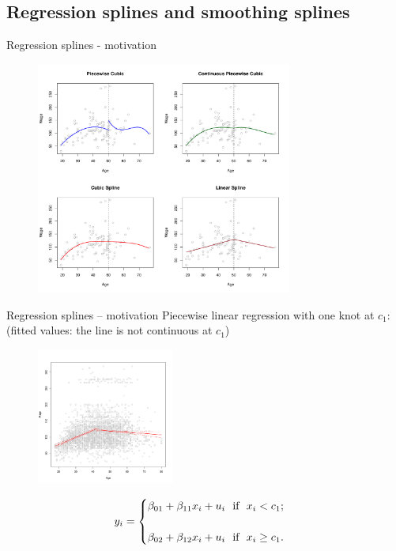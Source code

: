 \documentclass{beamer}
\begin{document}
\subsection{Regression splines and smoothing splines}
\begin{frame}{Regression splines - motivation}
\centering
\vspace{-0.2cm}
\begin{figure}
  \centering
  \includegraphics[trim=0cm 0cm 0cm 0cm, clip=true, width=0.75\textwidth]{IMG/ISLR73.pdf}
\end{figure}
\end{frame}
\begin{frame}{Regression splines -- motivation}
\centering
Piecewise linear regression with one knot at $c_1$:\\
(fitted values: the line is not continuous at $c_1$)\\
\vspace{-0.2cm}
\begin{figure}
  \centering
  \includegraphics[trim=0cm 0cm 0cm 0cm, clip=true, width=0.4\textwidth]{IMG/ISLR73a.pdf}
\end{figure}
\vspace{-0.2cm}
\begin{equation*}
y_i = 
    \begin{cases}
        \beta_{01} + \beta_{11} x_i + u_i \textnormal{~~if~~} x_i <  c_1 ;& \\ ~ & \\
         \beta_{02} + \beta_{12} x_i + u_i \textnormal{~~if~~} x_i \geq  c_1 .& 
    \end{cases}
\end{equation*}
\end{frame}
\end{document}
